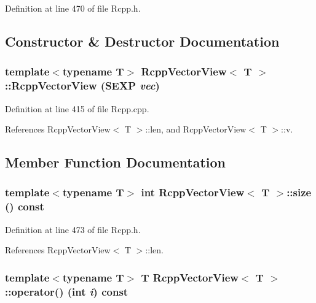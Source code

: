 Definition at line 470 of file Rcpp.h.

\subsection{Constructor \& Destructor Documentation}
\hypertarget{classRcppVectorView_d2e90fed8ee8a40f56591cc94f83041e}{
\subsubsection[RcppVectorView]{\setlength{\rightskip}{0pt plus 5cm}template$<$typename T$>$ {\bf RcppVectorView}$<$ T $>$::{\bf RcppVectorView} (SEXP {\em vec})}}
\label{classRcppVectorView_d2e90fed8ee8a40f56591cc94f83041e}




Definition at line 415 of file Rcpp.cpp.

References RcppVectorView$<$ T $>$::len, and RcppVectorView$<$ T $>$::v.

\subsection{Member Function Documentation}
\hypertarget{classRcppVectorView_d4c0f21296eb1cf7b2e2c8b8b43f4b0d}{
\subsubsection[size]{\setlength{\rightskip}{0pt plus 5cm}template$<$typename T$>$ int {\bf RcppVectorView}$<$ T $>$::size () const}}
\label{classRcppVectorView_d4c0f21296eb1cf7b2e2c8b8b43f4b0d}




Definition at line 473 of file Rcpp.h.

References RcppVectorView$<$ T $>$::len.\hypertarget{classRcppVectorView_13d63e990363a37ae29e0eab7400d297}{
\subsubsection[operator()]{\setlength{\rightskip}{0pt plus 5cm}template$<$typename T$>$ T {\bf RcppVectorView}$<$ T $>$::operator() (int {\em i}) const}}
\label{classRcppVectorView_13d63e990363a37ae29e0eab7400d297}




